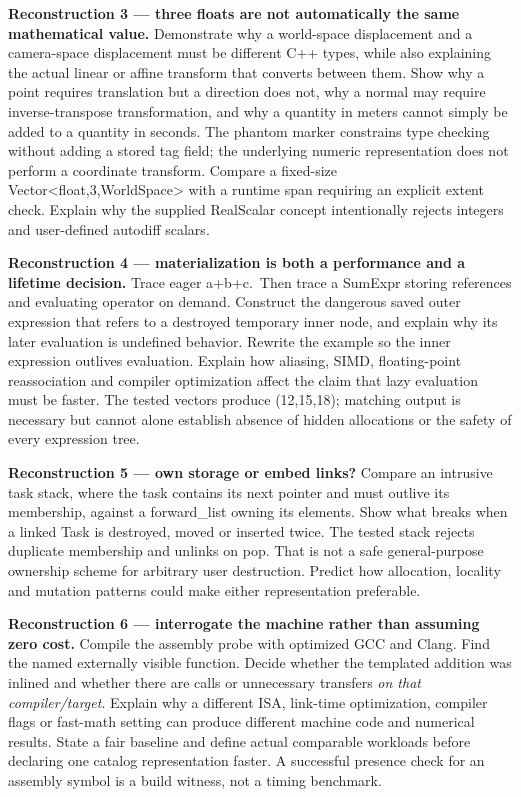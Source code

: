 \textbf{Reconstruction 3 --- three floats are not automatically the same mathematical value.} Demonstrate why a world-space displacement and a camera-space displacement must be different C++ types, while also explaining the actual linear or affine transform that converts between them. Show why a point requires translation but a direction does not, why a normal may require inverse-transpose transformation, and why a quantity in meters cannot simply be added to a quantity in seconds. The phantom marker constrains type checking without adding a stored tag field; the underlying numeric representation does not perform a coordinate transform. Compare a fixed-size Vector\textless float,3,WorldSpace\textgreater{} with a runtime span requiring an explicit extent check. Explain why the supplied RealScalar concept intentionally rejects integers and user-defined autodiff scalars.

\textbf{Reconstruction 4 --- materialization is both a performance and a lifetime decision.} Trace eager a+b+c.~Then trace a SumExpr storing references and evaluating operator\href{i}{} on demand. Construct the dangerous saved outer expression that refers to a destroyed temporary inner node, and explain why its later evaluation is undefined behavior. Rewrite the example so the inner expression outlives evaluation. Explain how aliasing, SIMD, floating-point reassociation and compiler optimization affect the claim that lazy evaluation must be faster. The tested vectors produce (12,15,18); matching output is necessary but cannot alone establish absence of hidden allocations or the safety of every expression tree.

\textbf{Reconstruction 5 --- own storage or embed links?} Compare an intrusive task stack, where the task contains its next pointer and must outlive its membership, against a forward\_list owning its elements. Show what breaks when a linked Task is destroyed, moved or inserted twice. The tested stack rejects duplicate membership and unlinks on pop. That is not a safe general-purpose ownership scheme for arbitrary user destruction. Predict how allocation, locality and mutation patterns could make either representation preferable.

\textbf{Reconstruction 6 --- interrogate the machine rather than assuming zero cost.} Compile the assembly probe with optimized GCC and Clang. Find the named externally visible function. Decide whether the templated addition was inlined and whether there are calls or unnecessary transfers \emph{on that compiler/target}. Explain why a different ISA, link-time optimization, compiler flags or fast-math setting can produce different machine code and numerical results. State a fair baseline and define actual comparable workloads before declaring one catalog representation faster. A successful presence check for an assembly symbol is a build witness, not a timing benchmark.

